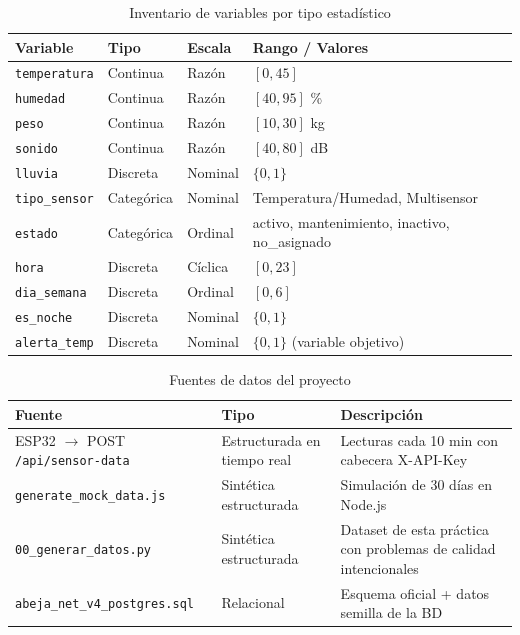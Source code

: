 \begin{table}[h!]
  \centering
  \caption{Inventario de variables por tipo estad\'istico}
  \begin{tabularx}{\textwidth}{lllX}
    \toprule
    \textbf{Variable} & \textbf{Tipo} & \textbf{Escala} & \textbf{Rango / Valores} \\
    \midrule
    \texttt{temperatura}  & Continua    & Raz\'on    & $[0, 45]$ \textcelsius{} \\
    \texttt{humedad}      & Continua    & Raz\'on    & $[40, 95]$ \% \\
    \texttt{peso}         & Continua    & Raz\'on    & $[10, 30]$ kg \\
    \texttt{sonido}       & Continua    & Raz\'on    & $[40, 80]$ dB \\
    \texttt{lluvia}       & Discreta    & Nominal    & $\{0, 1\}$ \\
    \texttt{tipo\_sensor} & Categ\'orica & Nominal   & Temperatura/Humedad, Multisensor \\
    \texttt{estado}       & Categ\'orica & Ordinal   & activo, mantenimiento, inactivo, no\_asignado \\
    \texttt{hora}         & Discreta    & C\'iclica  & $[0, 23]$ \\
    \texttt{dia\_semana}  & Discreta    & Ordinal    & $[0, 6]$ \\
    \texttt{es\_noche}    & Discreta    & Nominal    & $\{0, 1\}$ \\
    \texttt{alerta\_temp} & Discreta    & Nominal    & $\{0, 1\}$ (variable objetivo) \\
    \bottomrule
  \end{tabularx}
\end{table}

\begin{table}[h!]
  \centering
  \caption{Fuentes de datos del proyecto}
  \begin{tabularx}{\textwidth}{llX}
    \toprule
    \textbf{Fuente} & \textbf{Tipo} & \textbf{Descripci\'on} \\
    \midrule
    ESP32 $\rightarrow$ POST \texttt{/api/sensor-data} & Estructurada en tiempo real & Lecturas cada 10 min con cabecera X-API-Key \\
    \texttt{generate\_mock\_data.js} & Sint\'etica estructurada & Simulaci\'on de 30 d\'ias en Node.js \\
    \texttt{00\_generar\_datos.py}   & Sint\'etica estructurada & Dataset de esta pr\'actica con problemas de calidad intencionales \\
    \texttt{abeja\_net\_v4\_postgres.sql} & Relacional & Esquema oficial + datos semilla de la BD \\
    \bottomrule
  \end{tabularx}
\end{table}

